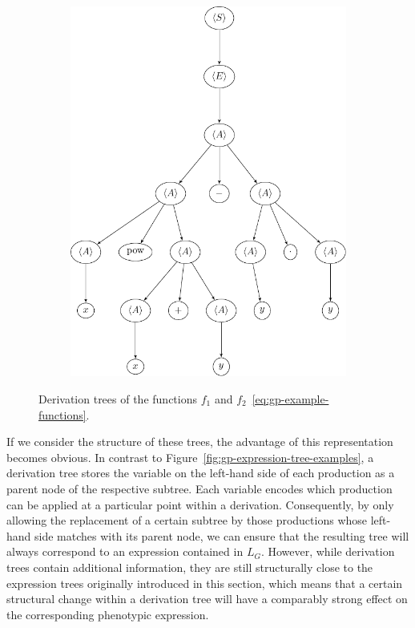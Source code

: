 \begin{figure}[h]
\begin{subfigure}{\textwidth}
	\includegraphics[scale=0.475]{figures/trees/gp_derivation_tree2.pdf}
	\end{subfigure}
	\caption{Derivation trees of the functions $f_1$ and $f_2$~\eqref{eq:gp-example-functions}.}
	\label{fig:gp-derivation-tree-examples}
\end{figure}
If we consider the structure of these trees, the advantage of this representation becomes obvious.
In contrast to Figure~\ref{fig:gp-expression-tree-examples}, a derivation tree stores the variable on the left-hand side of each production as a parent node of the respective subtree.
Each variable encodes which production can be applied at a particular point within a derivation.
Consequently, by only allowing the replacement of a certain subtree by those productions whose left-hand side matches with its parent node, we can ensure that the resulting tree will always correspond to an expression contained in $L_G$. 
However, while derivation trees contain additional information, they are still structurally close to the expression trees originally introduced in this section, which means that a certain structural change within a derivation tree will have a comparably strong effect on the corresponding phenotypic expression.
